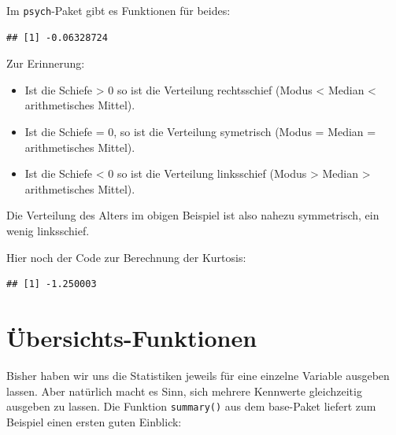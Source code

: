 \documentclass[
]{book}
\newenvironment{Shaded}{\begin{snugshade}}{\end{snugshade}}
\newcommand{\AttributeTok}[1]{\textcolor[rgb]{0.77,0.63,0.00}{#1}}
\newcommand{\ConstantTok}[1]{\textcolor[rgb]{0.00,0.00,0.00}{#1}}
\newcommand{\FunctionTok}[1]{\textcolor[rgb]{0.00,0.00,0.00}{#1}}
\newcommand{\NormalTok}[1]{#1}
\newcommand{\SpecialCharTok}[1]{\textcolor[rgb]{0.00,0.00,0.00}{#1}}
\begin{document}
Im \texttt{psych}-Paket gibt es Funktionen für beides:

\begin{Shaded}
\end{Shaded}

\begin{verbatim}
## [1] -0.06328724
\end{verbatim}

Zur Erinnerung:

\begin{itemize}
\item
  Ist die Schiefe \textgreater{} 0 so ist die Verteilung rechtsschief (Modus \textless{} Median \textless{} arithmetisches Mittel).
\item
  Ist die Schiefe = 0, so ist die Verteilung symetrisch (Modus = Median = arithmetisches Mittel).
\item
  Ist die Schiefe \textless{} 0 so ist die Verteilung linksschief (Modus \textgreater{} Median \textgreater{} arithmetisches Mittel).
\end{itemize}

Die Verteilung des Alters im obigen Beispiel ist also nahezu symmetrisch, ein wenig linksschief.

Hier noch der Code zur Berechnung der Kurtosis:

\begin{Shaded}
\end{Shaded}

\begin{verbatim}
## [1] -1.250003
\end{verbatim}

\hypertarget{uxfcbersichts-funktionen}{%
\section{Übersichts-Funktionen}\label{uxfcbersichts-funktionen}}

Bisher haben wir uns die Statistiken jeweils für eine einzelne Variable ausgeben lassen. Aber natürlich macht es Sinn, sich mehrere Kennwerte gleichzeitig ausgeben zu lassen. Die Funktion \texttt{summary()} aus dem base-Paket liefert zum Beispiel einen ersten guten Einblick:
\end{document}
